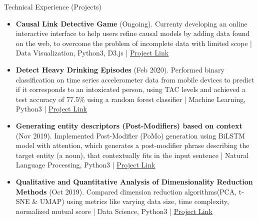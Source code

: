 \documentclass[]{mcdowellcv}
\begin{document}
	\begin{cvsection}{Technical Experience (Projects)}
		\begin{cvsubsection}{}{}{}
			\begin{itemize}
				\item \textbf{Causal Link Detective Game} (Ongoing). Currenty developing an online interactive interface to help users refine causal models by adding data found on the web, to overcome the problem of incomplete data with limited scope | Data Visualization, Python3, D3.js |  \underline{\href{https://github.com/Trisha11r/Causal_Link_Detective}{Project Link}}
			\end{itemize}
		\end{cvsubsection}
				
			\begin{cvsubsection}{}{}{}
			\begin{itemize}
				\item \textbf{Detect Heavy Drinking Episodes} (Feb 2020). Performed binary classification on time series accelerometer data from mobile devices to predict if it corresponds to an intoxicated person, using TAC levels and achieved a test accuracy of 77.5\% using a random forest classifier | Machine Learning, Python3 |  \underline{\href{https://github.com/Trisha11r/Detect_Heavy_Drinking_Episodes}{Project Link}}
			\end{itemize}
		\end{cvsubsection}
				
		\begin{cvsubsection}{}{}{}
			\begin{itemize}
				\item \textbf{Generating entity descriptors (Post-Modifiers) based on context} (Nov 2019).  Implemented Post-Modifier (PoMo) generation using BiLSTM model with attention, which generates a post-modifier phrase describing the target entity (a noun), that contextually fits in the input sentence | 
				Natural Language Processing, Python3 | \underline{\href{https://github.com/Trisha11r/Improvement-on-Knowledge-backed-Generation-Model-Using-Post-Modifier-Dataset}{Project Link}}
			\end{itemize}
		\end{cvsubsection}
				
		\begin{cvsubsection}{}{}{}
			\begin{itemize}
				\item \textbf{Qualitative and Quantitative Analysis of Dimensionality Reduction Methods}  (Oct 2019). Compared dimension reduction algorithms(PCA, t-SNE \& UMAP) using metrics like varying data size, time complexity, normalized mutual score | Data Science, Python3 |  \underline{\href{https://github.com/Trisha11r/dim_reduction_study}{Project Link}}
			\end{itemize}
		\end{cvsubsection}
				

\end{cvsection}
\end{document}

